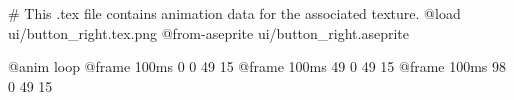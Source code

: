 # This .tex file contains animation data for the associated texture.
@load ui/button_right.tex.png
@from-aseprite ui/button_right.aseprite

@anim loop
	@frame 100ms 0 0 49 15
	@frame 100ms 49 0 49 15
	@frame 100ms 98 0 49 15
